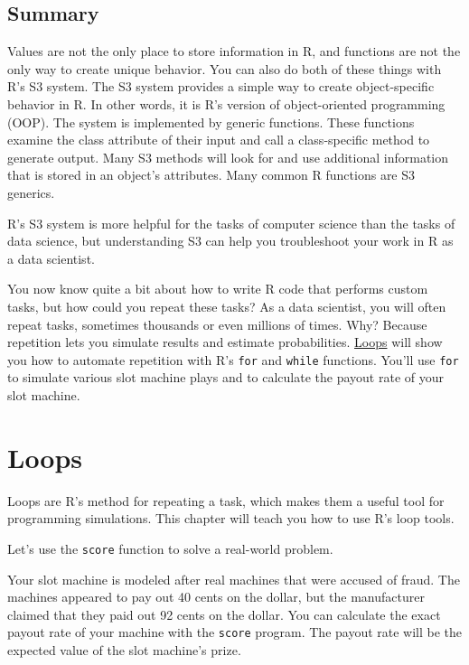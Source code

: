 \documentclass[
  letterpaper,
  DIV=11,
  numbers=noendperiod]{scrbook}
\begin{document}
\section{Summary}\label{summary-7}

Values are not the only place to store information in R, and functions
are not the only way to create unique behavior. You can also do both of
these things with R's S3 system. The S3 system provides a simple way to
create object-specific behavior in R. In other words, it is R's version
of object-oriented programming (OOP). The system is implemented by
generic functions. These functions examine the class attribute of their
input and call a class-specific method to generate output. Many S3
methods will look for and use additional information that is stored in
an object's attributes. Many common R functions are S3 generics.

R's S3 system is more helpful for the tasks of computer science than the
tasks of data science, but understanding S3 can help you troubleshoot
your work in R as a data scientist.

You now know quite a bit about how to write R code that performs custom
tasks, but how could you repeat these tasks? As a data scientist, you
will often repeat tasks, sometimes thousands or even millions of times.
Why? Because repetition lets you simulate results and estimate
probabilities. \hyperref[sec-loops]{Loops} will show you how to automate
repetition with R's \texttt{for} and \texttt{while} functions. You'll
use \texttt{for} to simulate various slot machine plays and to calculate
the payout rate of your slot machine.

\chapter{Loops}\label{sec-loops}

Loops are R's method for repeating a task, which makes them a useful
tool for programming simulations. This chapter will teach you how to use
R's loop tools.

Let's use the \texttt{score} function to solve a real-world problem.

Your slot machine is modeled after real machines that were accused of
fraud. The machines appeared to pay out 40 cents on the dollar, but the
manufacturer claimed that they paid out 92 cents on the dollar. You can
calculate the exact payout rate of your machine with the \texttt{score}
program. The payout rate will be the expected value of the slot
machine's prize.
\end{document}
